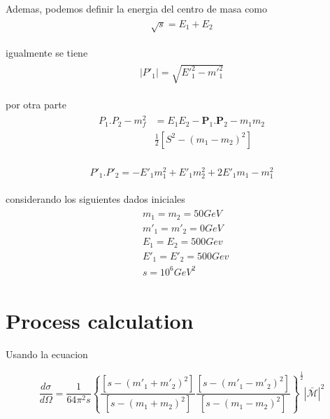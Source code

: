 Ademas, podemos definir la energia del centro de masa como
\begin{gather}
\begin{split}
\sqrt{s}=E_{1}+E_{2}
\end{split}
\end{gather}

igualmente se tiene
\begin{gather}
\begin{split}
|{P'}_{1}|=\sqrt{{E'}_{1}^{2}-{m'}_{1}^2}
\end{split}
\end{gather}

por otra parte
\begin{gather}
\begin{split}
{P}_{1}.{P}_{2}-{m}_{f}^{2}&={E}_{1}{E}_{2}-\textbf{P}_{1}.\textbf{P}_{2}-{m}_{1}{m}_{2}\\
&\frac{1}{2}[S^{2}-(m_{1}-m_{2})^{2}]
\end{split}
\end{gather}

\begin{gather}
\begin{split}
{P'}_{1}.{P'}_{2}=-{E'}_{1}{m}_{1}^{2}+{E'}_{1}{m}_{2}^{2}+2{E'}_{1}{m}_{1}-{m}_{1}^2
\end{split}
\end{gather}

considerando los siguientes dados iniciales 
\begin{gather}
\begin{split}
&{m}_{1}={m}_{2}=50 GeV\\
&{m'}_{1}={m'}_{2}=0 GeV\\
&{E}_{1}={E}_{2}=500 Gev\\
&{E'}_{1}={E'}_{2}=500 Gev\\
&{s}=10^{6}{GeV}^{2}
\end{split}
\end{gather}

\section{Process calculation}

Usando la ecuacion

\begin{equation}
  \frac{d\sigma}{d\Omega} = \frac{1}{64 \pi^2 s} \left\{ \frac{ [s-(m'_1 +m'_2)^2]}{[s-(m_1 + m_2)^2]} \frac{[s-(m'_1 - m'_2)^2 ]}{[s-(m_1 -m_2)^2]} \right\}^{\frac{1}{2}} | \bar{\mathcal{M}} |^2
\end{equation}


